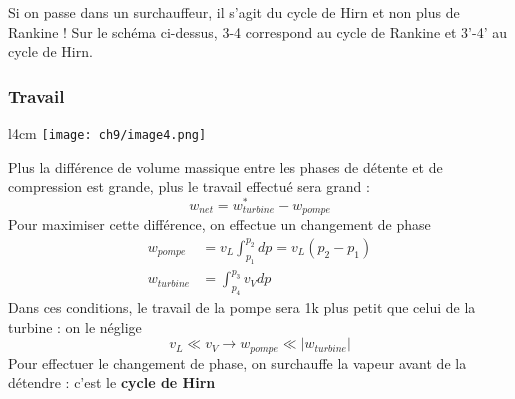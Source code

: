 	\danger Si on passe dans un surchauffeur, il s'agit du cycle de  Hirn et non 
	plus de Rankine ! Sur le schéma ci-dessus, 3-4 correspond au cycle de Rankine 
	et 3'-4' au cycle de Hirn.
	
		\subsubsection{Travail}
		\begin{wrapfigure}[8]{l}{4cm}
		\vspace{-7mm}
		\texttt{[image: ch9/image4.png]}
		\end{wrapfigure}
		Plus la différence de volume massique entre les phases de détente et de 
		compression est grande, plus le travail effectué sera grand :
		\begin{equation}
		w_{net} = w_{turbine}^* - w_{pompe}
		\end{equation}
		Pour maximiser cette différence, on effectue un changement de phase 
		\begin{equation}
		\begin{array}{ll}
		w_{pompe} &= v_L \int_{p_1}^{p_2} dp = v_L(p_2-p_1)\\
		w_{turbine} &= \int_{p_4}^{p_3} v_Vdp
		\end{array}
		\end{equation}
		Dans ces conditions, le travail de la pompe sera 1k plus petit que celui 
		de la turbine : on le néglige
		\begin{equation}
		v_L \ll v_V \rightarrow w_{pompe} \ll |w_{turbine}|
		\end{equation}
		Pour effectuer le changement de phase, on surchauffe la vapeur avant de 
		la détendre : c'est le \textbf{cycle de Hirn}
		
